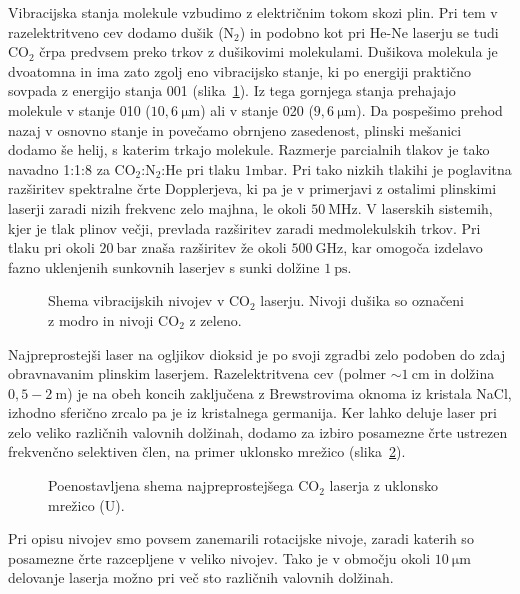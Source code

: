 Vibracijska stanja molekule vzbudimo z električnim tokom skozi plin. Pri 
tem v razelektritveno cev dodamo dušik (N$_2$) in podobno kot pri He-Ne laserju
se tudi CO$_2$ črpa predvsem preko trkov z dušikovimi molekulami. 
Dušikova molekula je dvoatomna in ima zato zgolj eno vibracijsko stanje, ki po energiji
praktično sovpada z energijo stanja 001 (slika~\ref{fig:CO2E}). Iz tega gornjega
stanja prehajajo molekule v stanje 010 ($10,6~\si{\micro\metre}$) ali v stanje
020 ($9,6~\si{\micro\metre}$). Da pospešimo prehod nazaj v osnovno stanje in povečamo
obrnjeno zasedenost, plinski mešanici dodamo še helij, s katerim trkajo molekule.
Razmerje parcialnih tlakov je tako navadno 1:1:8 za CO$_2$:N$_2$:He pri tlaku $1\si{\milli\bar}$. 
Pri tako nizkih tlakihi je poglavitna razširitev spektralne črte Dopplerjeva, ki 
pa je v primerjavi z ostalimi plinskimi laserji zaradi nizih frekvenc zelo majhna,
le okoli $50~\si{\mega\hertz}$. V laserskih sistemih, kjer je tlak plinov večji,
prevlada razširitev zaradi medmolekulskih trkov. Pri tlaku pri okoli $20~\si{\bar}$
znaša razširitev že okoli $500~\si{\giga\hertz}$, kar omogoča izdelavo fazno uklenjenih 
sunkovnih laserjev s sunki dolžine $1~\si{\pico\second}$. 

\begin{figure}[h]
\centering
\def\svgwidth{100truemm} 

\caption{Shema vibracijskih nivojev v CO$_2$ laserju. Nivoji dušika so označeni
z modro in nivoji CO$_2$ z zeleno.}
\label{fig:CO2E}
\end{figure}

Najpreprostejši laser na ogljikov dioksid je po svoji zgradbi zelo podoben do zdaj
obravnavanim plinskim laserjem. Razelektritvena cev (polmer $\sim 1~\si{\centi\metre}$
in dolžina $0,5-2~\si{\metre}$) je na obeh koncih zaključena z Brewstrovima oknoma
iz kristala NaCl, izhodno sferično zrcalo pa je iz kristalnega germanija. Ker lahko deluje
laser pri zelo veliko različnih valovnih dolžinah, dodamo za izbiro posamezne črte ustrezen
frekvenčno selektiven člen, na primer uklonsko mrežico (slika~\ref{fig:CO2S}).

\begin{figure}[h]
\centering
\def\svgwidth{90truemm} 

\caption{Poenostavljena shema najpreprostejšega CO$_2$ laserja z uklonsko mrežico (U).
}
\label{fig:CO2S}
\end{figure}

\begin{remark}
 Pri opisu nivojev smo povsem zanemarili rotacijske nivoje, zaradi katerih so 
 posamezne črte razcepljene v veliko nivojev. Tako je v območju okoli $10~\si{\micro\meter}$
 delovanje laserja možno pri več sto različnih valovnih dolžinah.
\end{remark}

